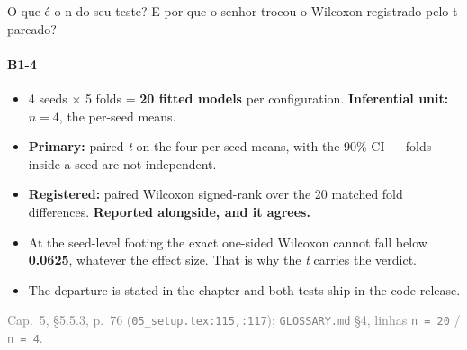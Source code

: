 \documentclass{beamer}
\begin{document}
\begin{frame}[noframenumbering]{O que é o n do seu teste? E por que o senhor trocou o Wilcoxon registrado pelo t pareado?}
    \framesubtitle{B1-4}
    \hypertarget{b14}{}
    \small
    \begin{itemize}\setlength{\itemsep}{0pt}\setlength{\parskip}{0pt}
        \item 4 seeds $\times$ 5 folds = \textbf{20 fitted models} per configuration. \textbf{Inferential unit: $n = 4$}, the per-seed means.
        \item \textbf{Primary:} paired \textit{t} on the four per-seed means, with the 90\% CI --- folds inside a seed are not independent.
        \item \textbf{Registered:} paired Wilcoxon signed-rank over the 20 matched fold differences. \textbf{Reported alongside, and it agrees.}
        \item At the seed-level footing the exact one-sided Wilcoxon cannot fall below \textbf{0.0625}, whatever the effect size. That is why the \textit{t} carries the verdict.
        \item The departure is stated in the chapter and both tests ship in the code release.
    \end{itemize}
    \vfill
    {\scriptsize
    \begin{minipage}[b]{0.775\linewidth}\raggedright\textcolor{gray}{Cap.~5, §5.5.3, p.~76 (\texttt{05\_setup.tex:115,:117}); \texttt{GLOSSARY.md} §4, linhas \texttt{n = 20} / \texttt{n = 4}.}\end{minipage}\hfill
    \begin{minipage}[b]{0.20\linewidth}\raggedleft \hyperlink{b0}{}\end{minipage}}
\end{frame}
\end{document}
